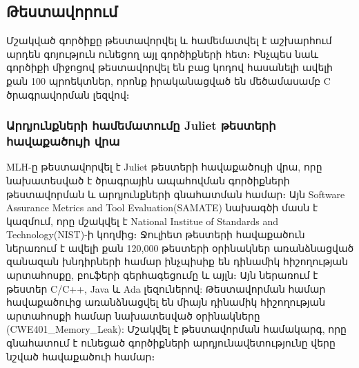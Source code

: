 {
    \subsection{Թեստավորում}\label{subsec:testing}
    Մշակված գործիքը թեստավորվել և համեմատվել է աշխարհում արդեն գոյություն ունեցող այլ գործիքների հետ։ Ինչպես նաև գործիքի
    միջոցով թեստավորվել են բաց կոդով հասանելի ավելի քան 100 պրոեկտներ, որոնք իրականացված են մեծամասամբ C ծրագրավորման լեզվով։

    \subsubsection{Արդյունքների համեմատումը Juliet թեստերի հավաքածույի վրա}
    MLH-ը թեստավորվել է Juliet թեստերի հավաքածույի վրա, որը նախատեսված է ծրագրային ապահովման գործիքների թեստավորման և
    արդյունքների գնահատման համար։ Այն Software Assurance Metrics and Tool Evaluation(SAMATE)\cite{SAMATE} նախագծի մասն է
    կազմում, որը մշակվել է National Institue of Standards and Technology(NIST)-ի կողմից։ Ջուլիետ թեստերի հավաքածուն
    ներառում է ավելի քան 120,000 թեստերի օրինակներ առանձնացված զանազան խնդիրների համար ինչպիսիք են դինամիկ հիշողության
    արտահոսքը, բուֆերի գերհագեցումը և այլն։ Այն ներառում է թեստեր C/C++, Java և Ada լեզուներով:
    Թեստավորման համար հավաքածուից առանձնացվել են միայն դինամիկ հիշողության արտահոսքի համար նախատեսված
    օրինակները (CWE401\_Memory\_Leak\cite{CWE401}): Մշակվել է թեստավորման համակարգ, որը գնահատում է ունեցած գործիքների
    արդյունավետությունը վերը նշված հավաքածուի համար։
}